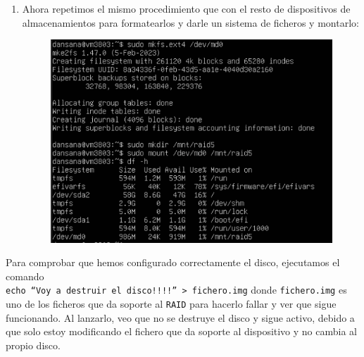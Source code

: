 \documentclass[10pt]{article}
\begin{document}
\begin{enumerate}
\begin{figure}[H]
		\end{figure}
		\item Ahora repetimos el mismo procedimiento que con el resto de dispositivos de almacenamientos para formatearlos y darle un sistema de ficheros y montarlo:
		\begin{figure}[H]
			\setlength{\abovecaptionskip}{0cm}
			\setlength{\belowcaptionskip}{0cm}
			\centering
			\includegraphics[width=0.6\linewidth]{Recursos/mountRAID.png}
		\end{figure}
	\end{enumerate}
	Para comprobar que hemos configurado correctamente el disco, ejecutamos el comando \\ \verb|echo “Voy a destruir el disco!!!!” > fichero.img| donde \verb|fichero.img| es uno de los ficheros que da soporte al \verb|RAID| para hacerlo fallar y ver que sigue funcionando. Al lanzarlo, veo que no se destruye el disco y sigue activo, debido a que solo estoy modificando el fichero que da soporte al dispositivo y no cambia al propio disco. 
	
\end{document}
